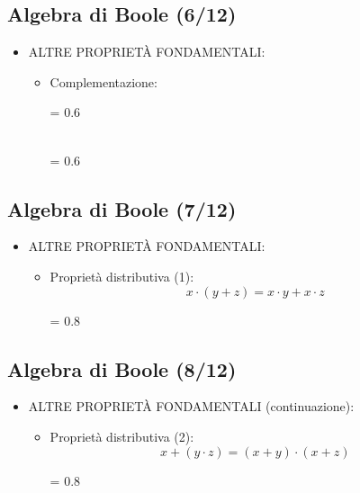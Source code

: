 \documentclass[10pt,a4paper,twoside,twocolumn]{article}
\begin{document}
\subsection{Algebra di Boole (6/12)}
\begin{itemize}
\item
ALTRE PROPRIET\`A FONDAMENTALI:
\begin{itemize}
\item
Complementazione:

\epsfxsize = 0.6 \columnwidth
{}

~ \\

\epsfxsize = 0.6 \columnwidth
{}
\end{itemize}
\end{itemize}



\subsection{Algebra di Boole (7/12)}
\begin{itemize}
\item
ALTRE PROPRIET\`A FONDAMENTALI:
\begin{itemize}
\item
Propriet\`a distributiva (1):
\[ x \cdot (y + z) = x \cdot y + x \cdot z \]
\begin{center}
\epsfxsize = 0.8 \columnwidth
{}
\end{center}
\end{itemize}
\end{itemize}



\subsection{Algebra di Boole (8/12)}
\begin{itemize}
\item
ALTRE PROPRIET\`A FONDAMENTALI (continuazione):
\begin{itemize}
\item
Propriet\`a distributiva (2):
\[ x + (y \cdot z) = (x  + y) \cdot (x + z) \]
\begin{center}
\epsfxsize = 0.8 \columnwidth
{}
\end{center}
\end{itemize}
\end{itemize}
\end{document}
